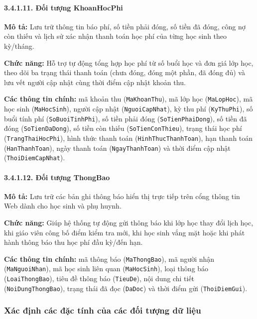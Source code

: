 \documentclass[12pt,a4paper]{article}
\begin{document}
\paragraph{3.4.1.11. Đối tượng KhoanHocPhi}\mbox{}\par
\textbf{Mô tả:} Lưu trữ thông tin báo phí, số tiền phải đóng, số tiền đã đóng, công nợ còn thiếu và lịch sử xác nhận thanh toán học phí của từng học sinh theo kỳ/tháng.\par
\textbf{Chức năng:} Hỗ trợ tự động tổng hợp học phí từ số buổi học và đơn giá lớp học, theo dõi ba trạng thái thanh toán (chưa đóng, đóng một phần, đã đóng đủ) và lưu vết người cập nhật cùng thời điểm cập nhật khoản thu.\par
\textbf{Các thông tin chính:} mã khoản thu (\texttt{MaKhoanThu}), mã lớp học (\texttt{MaLopHoc}), mã học sinh (\texttt{MaHocSinh}), người cập nhật (\texttt{NguoiCapNhat}), kỳ thu phí (\texttt{KyThuPhi}), số buổi tính phí (\texttt{SoBuoiTinhPhi}), số tiền phải đóng (\texttt{SoTienPhaiDong}), số tiền đã đóng (\texttt{SoTienDaDong}), số tiền còn thiếu (\texttt{SoTienConThieu}), trạng thái học phí (\texttt{TrangThaiHocPhi}), hình thức thanh toán (\texttt{HinhThucThanhToan}), hạn thanh toán (\texttt{HanThanhToan}), ngày thanh toán (\texttt{NgayThanhToan}) và thời điểm cập nhật (\texttt{ThoiDiemCapNhat}).

\paragraph{3.4.1.12. Đối tượng ThongBao}\mbox{}\par
\textbf{Mô tả:} Lưu trữ các bản ghi thông báo hiển thị trực tiếp trên cổng thông tin Web dành cho học sinh và phụ huynh.\par
\textbf{Chức năng:} Giúp hệ thống tự động gửi thông báo khi lớp học thay đổi lịch học, khi giáo viên công bố điểm kiểm tra mới, khi học sinh vắng mặt hoặc khi phát hành thông báo thu học phí đầu kỳ/đến hạn.\par
\textbf{Các thông tin chính:} mã thông báo (\texttt{MaThongBao}), mã người nhận (\texttt{MaNguoiNhan}), mã học sinh liên quan (\texttt{MaHocSinh}), loại thông báo (\texttt{LoaiThongBao}), tiêu đề thông báo (\texttt{TieuDe}), nội dung chi tiết (\texttt{NoiDungThongBao}), trạng thái đã đọc (\texttt{DaDoc}) và thời điểm gửi (\texttt{ThoiDiemGui}).

\subsubsection{Xác định các đặc tính của các đối tượng dữ liệu}
\end{document}
